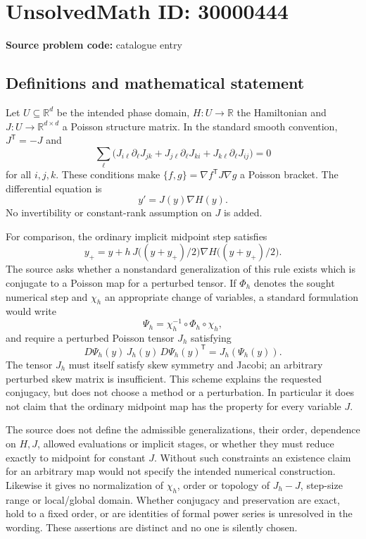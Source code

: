\documentclass[11pt]{article}
\newcommand{\R}{\mathbb{R}}
\begin{document}
\section*{UnsolvedMath ID: 30000444}
\textbf{Source problem code:} catalogue entry
\subsection{Definitions and mathematical statement}
Let \(U\subseteq\R^d\) be the intended phase domain, \(H:U\to\R\) the Hamiltonian and \(J:U\to\R^{d\times d}\) a Poisson structure matrix. In the standard smooth convention, \(J^{\mathsf T}=-J\) and
\[
 \sum_\ell\bigl(J_{i\ell}\partial_\ell J_{jk}
 +J_{j\ell}\partial_\ell J_{ki}+J_{k\ell}\partial_\ell J_{ij}\bigr)=0
\]
for all \(i,j,k\). These conditions make \(\{f,g\}=\nabla f^{\mathsf T}J\nabla g\) a Poisson bracket. The differential equation is
\[
 y'=J(y)\nabla H(y).
\]
No invertibility or constant-rank assumption on \(J\) is added.

For comparison, the ordinary implicit midpoint step satisfies
\[
 y_+=y+h\,J\bigl((y+y_+)/2\bigr)
                  \nabla H\bigl((y+y_+)/2\bigr).
\]
The source asks whether a nonstandard generalization of this rule exists which is conjugate to a Poisson map for a perturbed tensor. If \(\Phi_h\) denotes the sought numerical step and \(\chi_h\) an appropriate change of variables, a standard formulation would write
\[
 \Psi_h=\chi_h^{-1}\circ\Phi_h\circ\chi_h,
\]
and require a perturbed Poisson tensor \(J_h\) satisfying
\[
 D\Psi_h(y)\,J_h(y)\,D\Psi_h(y)^{\mathsf T}
 =J_h(\Psi_h(y)).
\]
The tensor \(J_h\) must itself satisfy skew symmetry and Jacobi; an arbitrary perturbed skew matrix is insufficient. This scheme explains the requested conjugacy, but does not choose a method or a perturbation. In particular it does not claim that the ordinary midpoint map has the property for every variable \(J\).

The source does not define the admissible generalizations, their order, dependence on \(H,J\), allowed evaluations or implicit stages, or whether they must reduce exactly to midpoint for constant \(J\). Without such constraints an existence claim for an arbitrary map would not specify the intended numerical construction. Likewise it gives no normalization of \(\chi_h\), order or topology of \(J_h-J\), step-size range or local/global domain. Whether conjugacy and preservation are exact, hold to a fixed order, or are identities of formal power series is unresolved in the wording. These assertions are distinct and no one is silently chosen.
\end{document}
